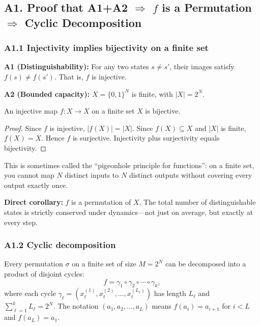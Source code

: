 \documentclass[reprint]{revtex4-2}
\begin{document}
\subsection{A1. Proof that A1+A2 $\Rightarrow$ $f$ is a Permutation $\Rightarrow$ Cyclic Decomposition}

\subsubsection{A1.1 Injectivity implies bijectivity on a finite set}

\textbf{A1 (Distinguishability):} For any two states $s\neq s'$, their images satisfy $f(s)\neq f(s')$. That is, $f$ is injective.

\textbf{A2 (Bounded capacity):} $X=\{0,1\}^N$ is finite, with $|X|=2^N$.

\begin{theorem}[Bijectivity]
\label{thm:bijectivity}
An injective map $f:X\to X$ on a finite set $X$ is bijective.
\end{theorem}

\begin{proof}
Since $f$ is injective, $|f(X)| = |X|$. Since $f(X)\subseteq X$ and $|X|$ is finite, $f(X)=X$. Hence $f$ is surjective. Injectivity plus surjectivity equals bijectivity.
\end{proof}

This is sometimes called the ``pigeonhole principle for functions'': on a finite set, you cannot map $N$ distinct inputs to $N$ distinct outputs without covering every output exactly once.

\textbf{Direct corollary:} $f$ is a permutation of $X$. The total number of distinguishable states is strictly conserved under dynamics---not just on average, but exactly at every step.

\subsubsection{A1.2 Cyclic decomposition}

Every permutation $\sigma$ on a finite set of size $M=2^N$ can be decomposed into a product of disjoint cycles:
\begin{equation}
f = \gamma_1 \circ \gamma_2 \circ \cdots \circ \gamma_k,
\end{equation}
where each cycle $\gamma_\ell = (x_\ell^{(1)}, x_\ell^{(2)}, \ldots, x_\ell^{(L_\ell)})$ has length $L_\ell$ and $\sum_{\ell=1}^k L_\ell = 2^N$. The notation $(a_1,a_2,\ldots,a_L)$ means $f(a_i)=a_{i+1}$ for $i<L$ and $f(a_L)=a_1$.
\end{document}
